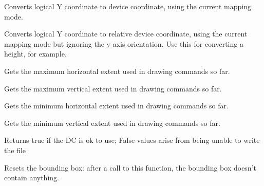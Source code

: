 \label{wxlatexdclogicaltodevicey}


Converts logical Y coordinate to device coordinate, using the current
mapping mode.

\label{wxlatexdclogicaltodeviceyrel}


Converts logical Y coordinate to relative device coordinate, using the current
mapping mode but ignoring the y axis orientation.
Use this for converting a height, for example.

\label{wxlatexdcmaxx}


Gets the maximum horizontal extent used in drawing commands so far.

\label{wxlatexdcmaxy}


Gets the maximum vertical extent used in drawing commands so far.

\label{wxlatexdcminx}


Gets the minimum horizontal extent used in drawing commands so far.

\label{wxlatexdcminy}


Gets the minimum vertical extent used in drawing commands so far.

\label{wxlatexdcok}


Returns true if the DC is ok to use; False values arise from being unable to 
write the file

\label{wxlatexdcresetboundingbox}


Resets the bounding box: after a call to this function, the bounding box
doesn't contain anything.



